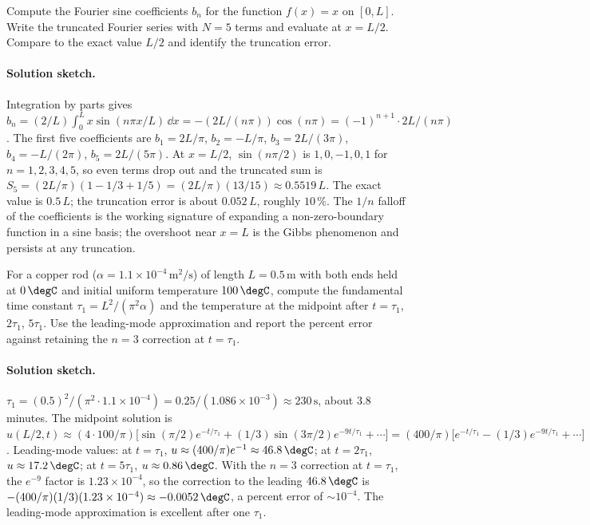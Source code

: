 \begin{exercise}
Compute the Fourier sine coefficients $b_{n}$ for the function
$f(x) = x$ on $[0, L]$. Write the truncated Fourier series with
$N = 5$ terms and evaluate at $x = L/2$. Compare to the exact
value $L/2$ and identify the truncation error.

\paragraph{Solution sketch.}
Integration by parts gives
$b_{n} = (2/L)\int_{0}^{L} x \sin(n\pi x/L)\,\dd x =
-(2L/(n\pi))\cos(n\pi) = (-1)^{n+1} \cdot 2L/(n\pi)$. The first
five coefficients are $b_{1} = 2L/\pi$, $b_{2} = -L/\pi$,
$b_{3} = 2L/(3\pi)$, $b_{4} = -L/(2\pi)$, $b_{5} = 2L/(5\pi)$.
At $x = L/2$, $\sin(n\pi/2)$ is $1, 0, -1, 0, 1$ for
$n = 1, 2, 3, 4, 5$, so even terms drop out and the truncated
sum is $S_{5} = (2L/\pi)(1 - 1/3 + 1/5) = (2L/\pi)(13/15)
\approx 0.5519\, L$. The exact value is $0.5\, L$; the
truncation error is about $0.052\, L$, roughly $10\,\%$. The
$1/n$ falloff of the coefficients is the working signature of
expanding a non-zero-boundary function in a sine basis; the
overshoot near $x = L$ is the Gibbs phenomenon and persists at
any truncation.
\end{exercise}

\begin{exercise}
For a copper rod ($\alpha = 1.1 \times 10^{-4}\,\si{\meter
\squared\per\second}$) of length $L = 0.5\,\si{\meter}$ with both
ends held at $0\,\degC$ and initial uniform temperature
$100\,\degC$, compute the fundamental time constant $\tau_{1} =
L^{2}/(\pi^{2}\alpha)$ and the temperature at the midpoint after
$t = \tau_{1}$, $2\tau_{1}$, $5\tau_{1}$. Use the leading-mode
approximation and report the percent error against retaining the
$n = 3$ correction at $t = \tau_{1}$.

\paragraph{Solution sketch.}
$\tau_{1} = (0.5)^{2}/(\pi^{2} \cdot 1.1 \times 10^{-4}) =
0.25/(1.086 \times 10^{-3}) \approx 230\,\si{\second}$, about
$3.8$ minutes. The midpoint solution is
$u(L/2, t) \approx (4 \cdot 100/\pi)\bigl[\sin(\pi/2) e^{-t/\tau_{1}}
+ (1/3)\sin(3\pi/2) e^{-9 t/\tau_{1}} + \cdots\bigr]
= (400/\pi)\bigl[e^{-t/\tau_{1}} - (1/3) e^{-9 t/\tau_{1}} +
\cdots\bigr]$. Leading-mode values: at $t = \tau_{1}$, $u
\approx (400/\pi) e^{-1} \approx 46.8\,\degC$; at $t = 2\tau_{1}$,
$u \approx 17.2\,\degC$; at $t = 5\tau_{1}$, $u \approx
0.86\,\degC$. With the $n = 3$ correction at $t = \tau_{1}$, the
$e^{-9}$ factor is $1.23 \times 10^{-4}$, so the correction to
the leading $46.8\,\degC$ is $-(400/\pi)(1/3)(1.23 \times 10^{-4})
\approx -0.0052\,\degC$, a percent error of $\sim 10^{-4}$. The
leading-mode approximation is excellent after one $\tau_{1}$.
\end{exercise}


